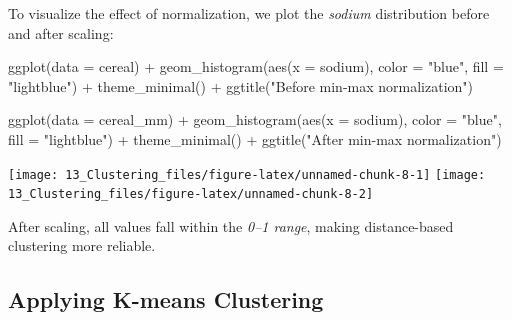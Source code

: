 \documentclass[
  11pt,
]{book}
\makeatletter
\newenvironment{Shaded}{}{}
\newcommand{\AttributeTok}[1]{#1}
\newcommand{\FloatTok}[1]{#1}
\newcommand{\FunctionTok}[1]{#1}
\newcommand{\NormalTok}[1]{#1}
\newcommand{\SpecialCharTok}[1]{\textcolor[rgb]{0.39,0.39,0.39}{#1}}
\newcommand{\StringTok}[1]{\textcolor[rgb]{0.39,0.39,0.39}{#1}}
\newenvironment{kframe}{%
\medskip{}
\setlength{\fboxsep}{.8em}
 \def\at@end@of@kframe{}%
 \ifinner\ifhmode%
  \def\at@end@of@kframe{\end{minipage}}%
  \begin{minipage}{\columnwidth}%
 \fi\fi%
 \def\FrameCommand##1{\hskip\@totalleftmargin \hskip-\fboxsep
 \colorbox{shadecolor}{##1}\hskip-\fboxsep
     \hskip-\linewidth \hskip-\@totalleftmargin \hskip\columnwidth}%
 \MakeFramed {\advance\hsize-\width
   \@totalleftmargin\z@ \linewidth\hsize
   \@setminipage}}%
 {\par\unskip\endMakeFramed%
 \at@end@of@kframe}
\renewenvironment{Shaded}{\begin{kframe}}{\end{kframe}}
\theoremstyle{definition}
\theoremstyle{definition}
\theoremstyle{definition}
\theoremstyle{definition}
\theoremstyle{remark}
\makeatother
\begin{document}
\begin{Shaded}
\end{Shaded}

To visualize the effect of normalization, we plot the \emph{sodium} distribution before and after scaling:

\begin{Shaded}
\begin{Highlighting}[]
\FunctionTok{ggplot}\NormalTok{(}\AttributeTok{data =}\NormalTok{ cereal) }\SpecialCharTok{+}
    \FunctionTok{geom\_histogram}\NormalTok{(}\FunctionTok{aes}\NormalTok{(}\AttributeTok{x =}\NormalTok{ sodium), }\AttributeTok{color =} \StringTok{"blue"}\NormalTok{, }\AttributeTok{fill =} \StringTok{"lightblue"}\NormalTok{) }\SpecialCharTok{+}
    \FunctionTok{theme\_minimal}\NormalTok{() }\SpecialCharTok{+} \FunctionTok{ggtitle}\NormalTok{(}\StringTok{"Before min{-}max normalization"}\NormalTok{)}

\FunctionTok{ggplot}\NormalTok{(}\AttributeTok{data =}\NormalTok{ cereal\_mm) }\SpecialCharTok{+}
    \FunctionTok{geom\_histogram}\NormalTok{(}\FunctionTok{aes}\NormalTok{(}\AttributeTok{x =}\NormalTok{ sodium), }\AttributeTok{color =} \StringTok{"blue"}\NormalTok{, }\AttributeTok{fill =} \StringTok{"lightblue"}\NormalTok{) }\SpecialCharTok{+} 
    \FunctionTok{theme\_minimal}\NormalTok{() }\SpecialCharTok{+} \FunctionTok{ggtitle}\NormalTok{(}\StringTok{"After min{-}max normalization"}\NormalTok{)}
\end{Highlighting}
\end{Shaded}

\texttt{[image: 13\_Clustering\_files/figure-latex/unnamed-chunk-8-1]} \texttt{[image: 13\_Clustering\_files/figure-latex/unnamed-chunk-8-2]}

After scaling, all values fall within the \emph{0--1 range}, making distance-based clustering more reliable.

\subsection{Applying K-means Clustering}\label{applying-k-means-clustering}
\end{document}
